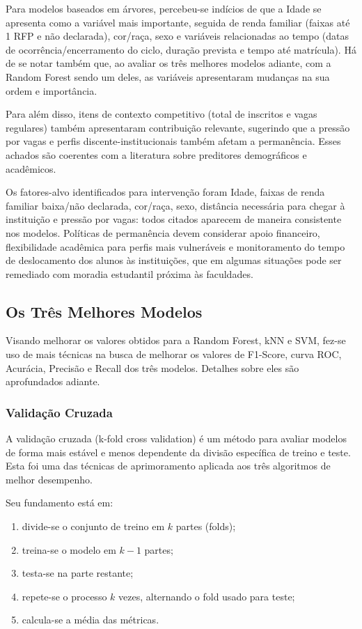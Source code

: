 \documentclass[english, spanish, brazilian]{RBIEarticle} %
\begin{document}
Para modelos baseados em árvores, percebeu-se indícios de que a Idade se apresenta como a variável mais importante, seguida de renda familiar (faixas até 1 RFP e não declarada), cor/raça, sexo e variáveis relacionadas ao tempo (datas de ocorrência/encerramento do ciclo, duração prevista e tempo até matrícula). Há de se notar também que, ao avaliar os três melhores modelos adiante, com a Random Forest sendo um deles, as variáveis apresentaram mudanças na sua ordem e importância.

Para além disso, itens de contexto competitivo (total de inscritos e vagas regulares) também apresentaram contribuição relevante, sugerindo que a pressão por vagas e perfis discente-institucionais também afetam a permanência. Esses achados são coerentes com a literatura sobre preditores demográficos e acadêmicos.

Os fatores-alvo identificados para intervenção foram Idade, faixas de renda familiar baixa/não declarada, cor/raça, sexo, distância necessária para chegar à instituição e pressão por vagas: todos citados aparecem de maneira consistente nos modelos. Políticas de permanência devem considerar apoio financeiro, flexibilidade acadêmica para perfis mais vulneráveis e monitoramento do tempo de deslocamento dos alunos às instituições, que em algumas situações pode ser remediado com moradia estudantil próxima às faculdades.

\subsection{Os Três Melhores Modelos}
Visando melhorar os valores obtidos para a Random Forest, kNN e SVM, fez-se uso de mais técnicas na busca de melhorar os valores de F1-Score, curva ROC, Acurácia, Precisão e Recall dos três modelos. Detalhes sobre eles são aprofundados adiante.

\subsubsection{Validação Cruzada}
A validação cruzada (k-fold cross validation) é um método para avaliar modelos de forma mais estável e menos dependente da divisão específica de treino e teste. Esta foi uma das técnicas de aprimoramento aplicada aos três algoritmos de melhor desempenho.

Seu fundamento está em:

\begin{enumerate}
    \item divide-se o conjunto de treino em $k$ partes (folds);
    \item treina-se o modelo em $k-1$ partes;
    \item testa-se na parte restante;
    \item repete-se o processo $k$ vezes, alternando o fold usado para teste;
    \item calcula-se a média das métricas.
\end{enumerate}
\end{document}
